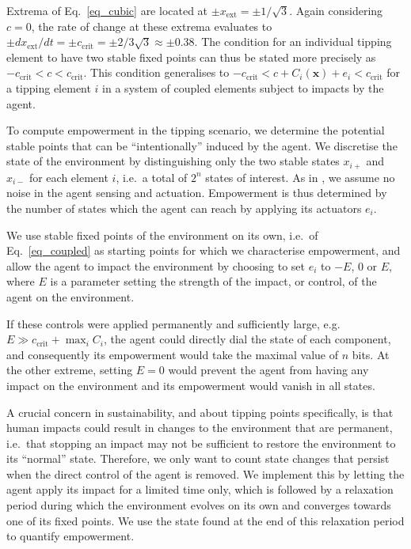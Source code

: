 \documentclass[letterpaper]{article}
\newcommand{\vectorsym}[1]{\ensuremath{\mathbf{#1}}}
\newcommand{\xextremum}{\ensuremath{x_{\mathrm{ext}}}}
\newcommand{\ccrit}{\ensuremath{c_{\mathrm{crit}}}}
\newcommand{\agentimpact}{\ensuremath{e}}
\begin{document}
Extrema of Eq.~\ref{eq_cubic} are located at
$\pm \xextremum = \pm 1 / \sqrt{3}$. Again considering $c = 0$, the
rate of change at these extrema evaluates to
$\pm d\xextremum / dt = \pm \ccrit = \pm 2 / 3\sqrt{3} \approx \pm
0.38$.
The condition for an individual tipping element to have two stable
fixed points can thus be stated more precisely as
$-\ccrit < c < \ccrit$. This condition generalises to
$-\ccrit < c + C_i(\vectorsym{x}) + \agentimpact_i < \ccrit$ for a
tipping element $i$ in a system of coupled elements subject to impacts
by the agent.

To compute empowerment in the tipping scenario, we determine the
potential stable points that can be ``intentionally'' induced by the
agent. We discretise the state of the environment by distinguishing
only the two stable states $x_{i+}$ and $x_{i-}$ for each element $i$,
i.e.\ a total of $2^n$ states of interest. As in
\citep{Kim2009_sustainability}, we assume no noise in the agent
sensing and actuation. Empowerment is thus determined by the number of
states which the agent can reach by applying its actuators
$\agentimpact_i$.

We use stable fixed points of the environment on its own, i.e.\ of
Eq.~\ref{eq_coupled} as starting points for which we characterise
empowerment, and allow the agent to impact the environment by choosing
to set $\agentimpact_i$ to $-E$, $0$ or $E$, where $E$ is a parameter
setting the strength of the impact, or control, of the agent on the
environment.

If these controls were applied permanently and sufficiently large,
e.g. $E \gg \ccrit + \max_i C_i$, the agent could directly dial the
state of each component, and consequently its empowerment would take
the maximal value of $n$ bits. At the other extreme, setting $E = 0$
would prevent the agent from having any impact on the environment and
its empowerment would vanish in all states.

A crucial concern in sustainability, and about tipping points
specifically, is that human impacts could result in changes to the
environment that are permanent, i.e.\ that stopping an impact may not
be sufficient to restore the environment to its ``normal'' state.
Therefore, we only want to count state changes that persist when the
direct control of the agent is removed. We implement this by letting
the agent apply its impact for a limited time only, which is followed
by a relaxation period during which the environment evolves on its own
and converges towards one of its fixed points. We use the state found
at the end of this relaxation period to quantify empowerment.
\end{document}
